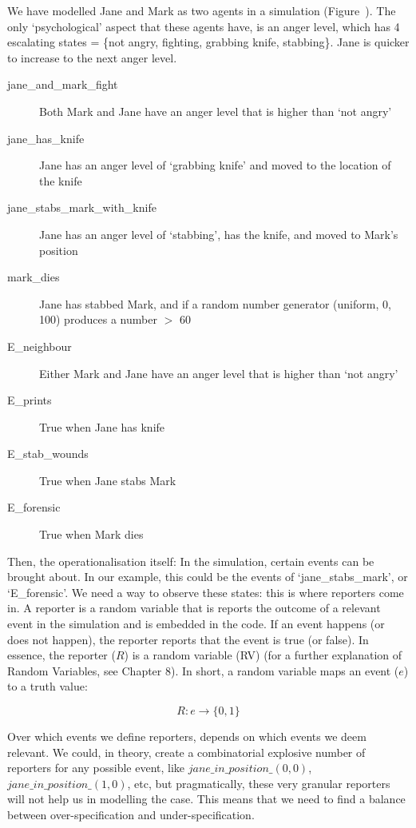 \begin{example}

We have modelled Jane and Mark as two agents in a simulation (Figure~). The only `psychological' aspect that these agents have, is an anger level, which has 4 escalating states = \{not angry, fighting, grabbing knife, stabbing\}. Jane is quicker to increase to the next anger level. 

\begin{description}
\item[jane\_and\_mark\_fight ]  Both Mark and Jane have an anger level that is higher than `not angry'
\item[jane\_has\_knife ] Jane has an anger level of `grabbing knife' and moved to the location of the knife
\item[jane\_stabs\_mark\_with\_knife ] Jane has an anger level of `stabbing', has the knife, and moved to Mark's position
\item[mark\_dies ] Jane has stabbed Mark, and if a random number generator (uniform, 0, 100) produces a number $>$ 60
\item[E\_neighbour ] Either Mark and Jane have an anger level that is higher than `not angry'
\item[E\_prints ] True when Jane has knife
\item[E\_stab\_wounds ] True when Jane stabs Mark
\item[E\_forensic ] True when Mark dies

\end{description}

\end{example}


Then, the operationalisation itself: In the simulation, certain events can be brought about. In our example, this could be the events of `jane\_stabs\_mark', or `E\_forensic'.  We need a way to observe these states: this is where reporters come in. A reporter is a random variable that is reports the outcome of a relevant event in the simulation and is embedded in the code. If an event happens (or does not happen), the reporter reports that the event is true (or false). In essence, the reporter ($R$) is a random variable (RV) (for a further explanation of Random Variables, see Chapter 8). In short, a random variable maps an event ($e$) to a truth value:

\[ R : e \rightarrow \{0, 1\} \]

Over which events we define reporters, depends on which events we deem relevant. We could, in theory, create a combinatorial explosive number of reporters for any possible event, like $jane\_in\_position\_(0, 0)$, $jane\_in\_position\_(1, 0)$, etc, but pragmatically, these very granular reporters will not help us in modelling the case. This means that we need to find a balance between over-specification and under-specification.

